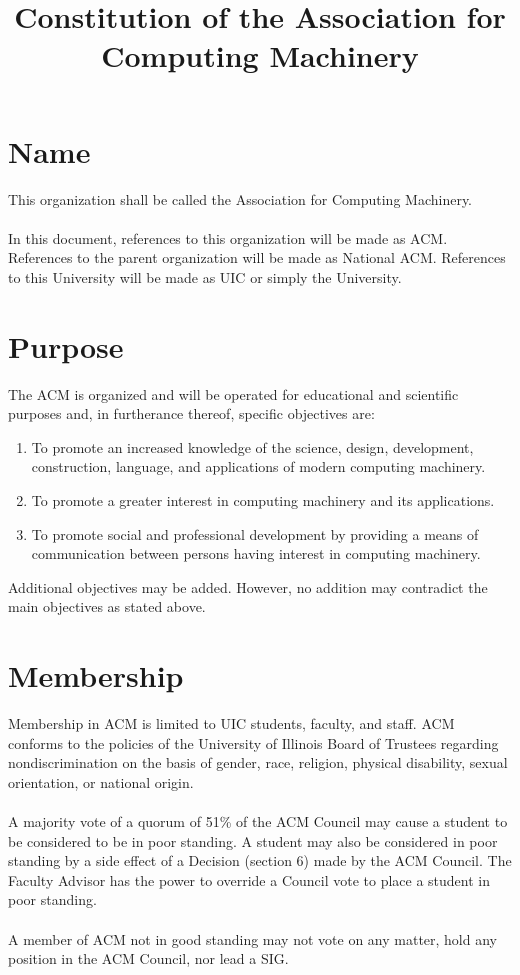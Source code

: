 \documentclass[12pt,titlepage]{article}
\begin{document}
\title{Constitution of the Association for Computing Machinery}
\maketitle

\tableofcontents

\pagebreak

\section{Name}

This organization shall be called the Association for Computing Machinery.\\
\\
In this document, references to this organization will be made as ACM. References to the parent organization will be made as National ACM. References to this University will be made as UIC or simply the University.

\section{Purpose}

The ACM is organized and will be operated for educational and scientific purposes and, in furtherance thereof, specific objectives are:
\begin{enumerate}
\item To promote an increased knowledge of the science, design, development, construction, language, and applications of modern computing machinery.
\item To promote a greater interest in computing machinery and its applications.
\item To promote social and professional development by providing a means of communication between persons having interest in computing machinery.
\end{enumerate}
Additional objectives may be added. However, no addition may contradict the main objectives as stated above.

\section{Membership}

Membership in ACM is limited to UIC students, faculty, and staff. ACM conforms to the policies of the University of Illinois Board of Trustees regarding nondiscrimination on the basis of gender, race, religion, physical disability, sexual orientation, or national origin.\\
\\
A majority vote of a quorum of 51\% of the ACM Council may cause a student to be considered to be in poor standing. A student may also be considered in poor standing by a side effect of a Decision (section 6) made by the ACM Council. The Faculty Advisor has the power to override a Council vote to place a student in poor standing.\\
\\
A member of ACM not in good standing may not vote on any matter, hold any position in the ACM Council, nor lead a SIG.
\end{document}

